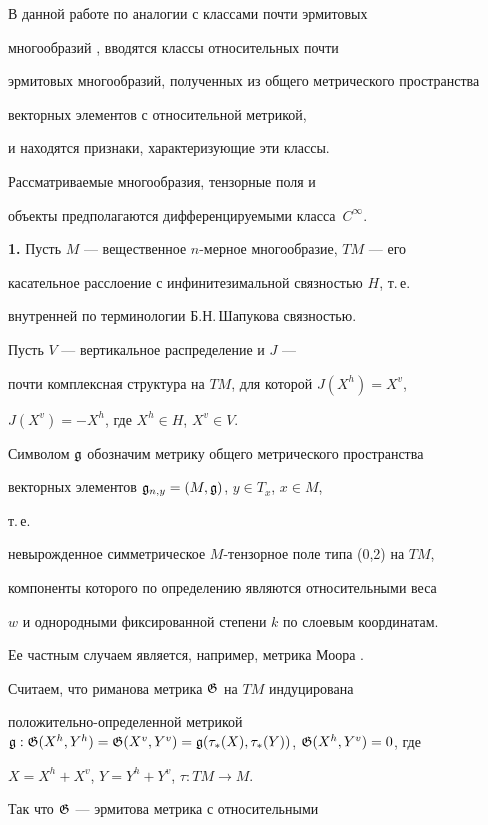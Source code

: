  


В данной работе по аналогии с классами почти эрмитовых 


многообразий \cite{3}, \cite{4} вводятся классы относительных почти


эрмитовых многообразий, полученных из общего метрического пространства


векторных элементов с относительной метрикой,


и находятся признаки, характеризующие эти классы. 


Рассматриваемые многообразия, тензорные поля и 


объекты предполагаются дифференцируемыми класса~$C^\infty$.  


 


{\bf 1.} Пусть $M$ --- вещественное $n$-мерное многообразие, $TM$ --- его  


касательное расслоение с инфинитезимальной связностью $H$, т.\,е. 


внутренней по терминологии Б.Н.\,Шапукова \cite{1} связностью.


Пусть $V$ --- вертикальное распределение и $J$ --- 


почти комплексная структура на $TM$, для которой $J(X^h)=X^v$, 


$J(X^v)=-X^h$, где $X^h\in H$, $X^v\in V$.


Символом $\frak g$ обозначим метрику общего метрического пространства 


векторных элементов $\frak g_{n,y}=(M,\frak g)$, $y\in T_x$, $x\in M$,


т.\,е. 


невырожденное симметрическое $M$-тензорное поле типа (0,2) на $TM$,  


компоненты которого по определению являются относительными веса 


$w$ и однородными фиксированной степени $k$ по слоевым координатам. 


Ее частным случаем является, например, метрика Моора \cite{2}.


Считаем, что риманова метрика $\frak G$ на $TM$ индуцирована 


положительно-определенной метрикой $\frak g:\frak G(X^h,Y^h)=\frak 


G(X^v,Y^v)=\frak g(\tau_*(X),\tau_*(Y))$, $\frak G(X^h,Y^v)=0$, где 


$X=X^h+X^v$, $Y=Y^h+Y^v$, $\tau:TM\to M$. 


Так что $\frak G$ --- эрмитова метрика с относительными 


